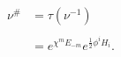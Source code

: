 \begin{equation}
\begin{aligned}
\nu ^{\#}&=\tau (\nu ^{-1})\\
\\
&= e^{\chi ^{m}E_{-m}}e^{\frac{1}{2}\phi
^{i}H_{i}}.
\end{aligned}
\end{equation}

